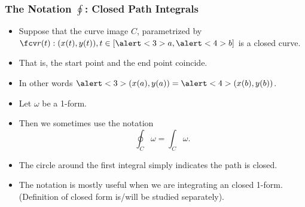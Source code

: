 \begin{frame}
\frametitle{The Notation $\oint$: Closed Path Integrals}
\begin{itemize}
\item Suppose that the curve image $C$, parametrized by $\fcv r(t):(x(t), y(t)), t\in [\alert<3>{a},\alert<4>{b} ]$ is a closed curve.
\item<2-> That is, the \alert<3>{start point} and the \alert<4>{end point} coincide. 
\item<3-> In other words $\alert<3>{(x(a), y(a))}=\alert<4>{(x(b), y(b))}$.
\item<5-> Let $\omega$ be a 1-form.
\item<6-> Then we sometimes use the notation 
\[
\oint_C\omega = \int_C \omega.
\]
\item<7-> The circle around the first integral simply indicates the path is closed.
\item<8-> The notation is mostly useful when we are integrating an closed 1-form. (Definition of closed form is/will be studied separately).
\end{itemize}
\end{frame}